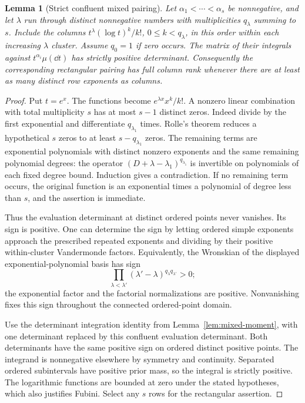 \documentclass[11pt]{amsart}
\newtheorem{lemma}[theorem]{Lemma}
\theoremstyle{definition}\newtheorem{definition}[theorem]{Definition}
\theoremstyle{remark}\newtheorem{remark}[theorem]{Remark}
\begin{document}
\begin{lemma}[Strict confluent mixed pairing]\label{lem:confluent-positive}
Let $\alpha_1<\cdots<\alpha_s$ be nonnegative, and let $\lambda$ run
through distinct nonnegative numbers with multiplicities $q_\lambda$
summing to $s$. Include the columns
$t^\lambda(\log t)^k/k!$, $0\le k<q_\lambda$, in this order within
each increasing $\lambda$ cluster. Assume $q_0=1$ if zero occurs.
The matrix of their integrals against $t^{\alpha_i}\mu(\dd t)$ has
strictly positive determinant. Consequently the corresponding rectangular
pairing has full column rank whenever there are at least as many distinct
row exponents as columns.
\end{lemma}
\begin{proof}
Put $t=e^x$. The functions become $e^{\lambda x}x^k/k!$.
A nonzero linear combination with total multiplicity $s$ has at most
$s-1$ distinct zeros. Indeed divide by the first exponential and
differentiate $q_{\lambda_1}$ times. Rolle's theorem reduces a hypothetical
$s$ zeros to at least $s-q_{\lambda_1}$ zeros. The remaining terms are
exponential polynomials with distinct nonzero exponents and the same
remaining polynomial degrees: the operator $(D+\lambda-\lambda_1)^{q_{\lambda_1}}$
is invertible on polynomials of each fixed degree bound. Induction gives
a contradiction. If no remaining term occurs, the original function is
an exponential times a polynomial of degree less than $s$, and the
assertion is immediate.

Thus the evaluation determinant at distinct ordered points never
vanishes. Its sign is positive. One can determine the sign by letting
ordered simple exponents approach the prescribed repeated exponents and
dividing by their positive within-cluster Vandermonde factors. Equivalently,
the Wronskian of the displayed exponential-polynomial basis has sign
\[
 \prod_{\lambda<\lambda'}(\lambda'-\lambda)^{q_\lambda q_{\lambda'}}>0;
\]
the exponential factor and the factorial normalizations are positive.
Nonvanishing fixes this sign throughout the connected ordered-point domain.

Use the determinant integration identity from
Lemma~\ref{lem:mixed-moment}, with one determinant replaced by this
confluent evaluation determinant. Both determinants have the same positive
sign on ordered distinct positive points. The integrand is nonnegative
elsewhere by symmetry and continuity. Separated ordered subintervals have
positive prior mass, so the integral is strictly positive. The logarithmic
functions are bounded at zero under the stated hypotheses, which also
justifies Fubini. Select any $s$ rows for the rectangular assertion.
\end{proof}
\end{document}

